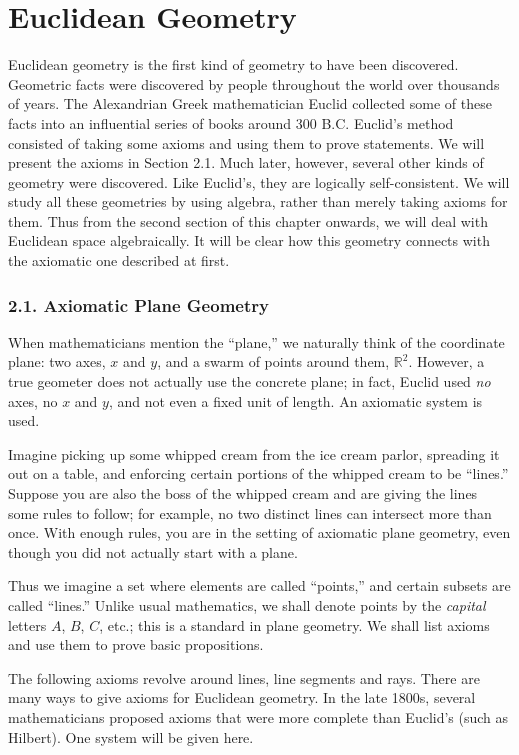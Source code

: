 \documentclass[leqno]{book}
\begin{document}
\chapter{Euclidean Geometry}

Euclidean geometry is the first kind of geometry to have been discovered.  Geometric facts were discovered by people throughout the world over thousands of years.  The Alexandrian Greek mathematician Euclid collected some of these facts into an influential series of books around 300 B.C.  Euclid's method consisted of taking some axioms and using them to prove statements.  We will present the axioms in Section 2.1.  Much later, however, several other kinds of geometry were discovered.  Like Euclid's, they are logically self-consistent.  We will study all these geometries by using algebra, rather than merely taking axioms for them.  Thus from the second section of this chapter onwards, we will deal with Euclidean space algebraically.  It will be clear how this geometry connects with the axiomatic one described at first.

\subsection*{2.1. Axiomatic Plane Geometry}
When mathematicians mention the ``plane,'' we naturally think of the coordinate plane: two axes, $x$ and $y$, and a swarm of points around them, $\mathbb R^2$.  However, a true geometer does not actually use the concrete plane; in fact, Euclid used \emph{no} axes, no $x$ and $y$, and not even a fixed unit of length.  An axiomatic system is used.

Imagine picking up some whipped cream from the ice cream parlor, spreading it out on a table, and enforcing certain portions of the whipped cream to be ``lines.''  Suppose you are also the boss of the whipped cream and are giving the lines some rules to follow; for example, no two distinct lines can intersect more than once.  With enough rules, you are in the setting of axiomatic plane geometry, even though you did not actually start with a plane.

Thus we imagine a set where elements are called ``points,'' and certain subsets are called ``lines.''  Unlike usual mathematics, we shall denote points by the \emph{capital} letters $A$, $B$, $C$, etc.; this is a standard in plane geometry.  We shall list axioms and use them to prove basic propositions.

The following axioms revolve around lines, line segments and rays.  There are many ways to give axioms for Euclidean geometry.  In the late 1800s, several mathematicians proposed axioms that were more complete than Euclid's (such as Hilbert).  One system will be given here.\\
\end{document}
